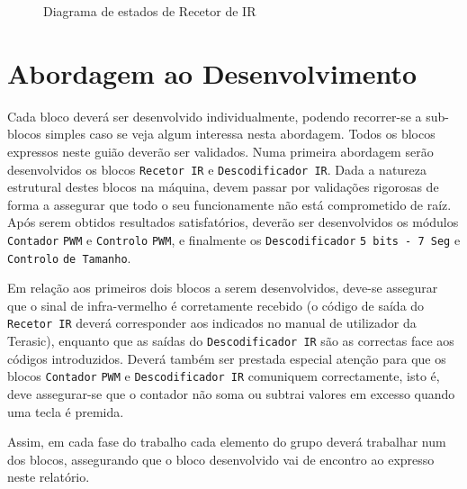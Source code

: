 \documentclass[a4paper,11pt,openright,oneside]{report}
\begin{document}
\begin{figure}[ht]
\center
{}
\caption{Diagrama de estados de Recetor de IR}
\label{fig:ir_leds3}
\end{figure}

\section{Abordagem ao Desenvolvimento}

Cada bloco deverá ser desenvolvido individualmente, podendo recorrer-se a sub-blocos simples caso se veja algum interessa nesta abordagem. Todos os blocos expressos neste guião deverão ser validados. Numa primeira abordagem serão desenvolvidos os blocos \verb|Recetor IR| e \verb|Descodificador IR|. Dada a natureza estrutural destes blocos na máquina, devem passar por validações rigorosas de forma a assegurar que todo o seu funcionamente não está comprometido de raíz. Após serem obtidos resultados satisfatórios, deverão ser desenvolvidos os módulos \verb|Contador| \verb|PWM| e \verb|Controlo| \verb|PWM|, e finalmente os \verb|Descodificador| \verb|5 bits - 7 Seg| e \verb|Controlo| \verb|de Tamanho|.

Em relação aos primeiros dois blocos a serem desenvolvidos, deve-se assegurar que o sinal de infra-vermelho é corretamente recebido (o código de saída do \verb|Recetor IR| deverá corresponder aos indicados no manual de utilizador da Terasic), enquanto que as saídas do \verb|Descodificador IR| são as correctas face aos códigos introduzidos. Deverá também ser prestada especial atenção para que os blocos \verb|Contador| \verb|PWM| e \verb|Descodificador IR| comuniquem correctamente, isto é, deve assegurar-se que o contador não soma ou subtrai valores em excesso quando uma tecla é premida.

Assim, em cada fase do trabalho cada elemento do grupo deverá trabalhar num dos blocos, assegurando que o bloco desenvolvido vai de encontro ao expresso neste relatório.
\end{document}

